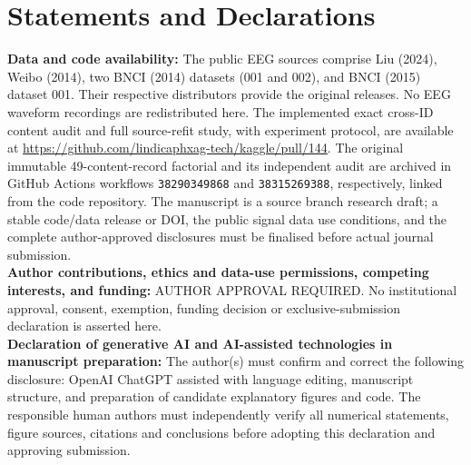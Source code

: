 \documentclass[preprint,12pt]{elsarticle}
\begin{document}
\section*{Statements and Declarations}
\textbf{Data and code availability:}
The public EEG sources comprise Liu (2024),
Weibo (2014), two BNCI (2014) datasets
(001 and 002), and BNCI (2015) dataset 001.
Their respective distributors provide the original releases.
No EEG waveform recordings are redistributed here.
The implemented exact cross-ID content audit and
full source-refit study, with experiment protocol,
are available at
\url{https://github.com/lindicaphxag-tech/kaggle/pull/144}.
The original immutable 49-content-record
factorial and its independent audit are archived
in GitHub Actions workflows
\texttt{38290349868} and \texttt{38315269388},
respectively, linked from the code repository. The manuscript is a source branch
research draft; a stable code/data release or DOI,
the public signal data use conditions, and
the complete author-approved disclosures
must be finalised before actual journal submission.\\
\textbf{Author contributions, ethics and data-use permissions,
competing interests, and funding:} AUTHOR APPROVAL REQUIRED.
No institutional approval, consent, exemption, funding decision or
exclusive-submission declaration is asserted here.\\
\textbf{Declaration of generative AI and AI-assisted technologies
in manuscript preparation:}
The author(s) must confirm and correct the following disclosure:
OpenAI ChatGPT assisted with language editing, manuscript structure,
and preparation of candidate explanatory figures and code.
The responsible human authors must independently verify all
numerical statements, figure sources, citations and conclusions
before adopting this declaration and approving submission.



\end{document}
